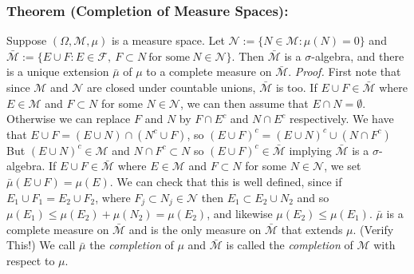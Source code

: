 \documentclass{article}
\begin{document}
\subsubsection{Theorem (Completion of Measure Spaces):}
Suppose $(\Omega, \mathcal{M}, \mu)$ is a measure space. Let $\mathcal{N} := \{N \in\mathcal{M}: \mu(N) =0\}$ and $\bar{\mathcal{M}}:= \{E\cup F: E \in \mathcal{F}, \ F \subset N \ \text{for some}\  N\in \mathcal{N}\}$. Then $\bar{\mathcal{M}}$ is a $\sigma$-algebra, and there is a unique extension $\bar{\mu}$ of $\mu$ to a complete measure on $\bar{\mathcal{M}}$. \newline \newline
\textit{Proof.} \newline \newline
First note that since $\mathcal{M}$ and $\mathcal{N}$ are closed under countable unions, $\bar{\mathcal{M}}$ is too. If $E \cup F \in \bar{\mathcal{M}}$ where $E \in \mathcal{M}$ and $F \subset N$ for some $N \in \mathcal{N}$, we can then assume that $E\cap N = \emptyset$. Otherwise we can replace $F$ and $N$ by $F \cap E^c$ and $N \cap E^c$ respectively. We have that $E \cup F = (E \cup N )\cap (N^c \cup F)$, so $(E \cup F)^c = (E\cup N)^c \cup (N \cap F^c)$ But $(E \cup N)^c \in \mathcal{M}$ and $N \cap F^c\subset N$ so  $(E \cup F)^c \in \bar{\mathcal{M}}$ implying $\bar{\mathcal{M}}$ is a $\sigma$-algebra. \newline \newline
If $E \cup F \in \bar{\mathcal{M}}$ where $E \in \mathcal{M}$ and $F \subset N$ for some $N \in \mathcal{N}$, we set $\bar{\mu}(E\cup F) = \mu(E)$. We can check that this is well defined, since if $E_1 \cup F_1 = E_2 \cup F_2$, where $F_j\subset N_j\in \mathcal{N}$ then $E_1\subset E_2 \cup N_2$ and so $\mu(E_1) \leq \mu(E_2)+ \mu(N_2)=\mu(E_2)$, and likewise $\mu(E_2) \leq \mu(E_1)$. $\bar{\mu}$ is a complete measure on $\bar{\mathcal{M}}$ and is the only measure on $\bar{\mathcal{M}}$ that extends $\mu$.  (Verify This!) \newline \newline
We call $\bar{\mu}$ the \emph{completion} of $\mu$ and $\bar{\mathcal{M}}$ is called the \emph{completion} of $\mathcal{M}$ with respect to $\mu$.
\end{document}

